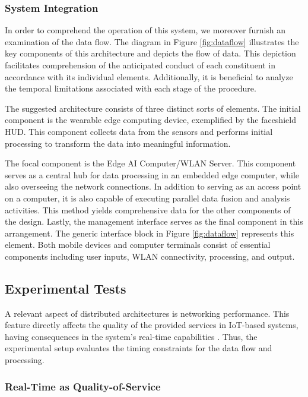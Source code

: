 \subsubsection{System Integration}

In order to comprehend the operation of this system, we moreover furnish an examination of the data flow. The diagram in Figure \ref{fig:dataflow} illustrates the key components of this architecture and depicts the flow of data. This depiction facilitates comprehension of the anticipated conduct of each constituent in accordance with its individual elements. Additionally, it is beneficial to analyze the temporal limitations associated with each stage of the procedure.

The suggested architecture consists of three distinct sorts of elements. The initial component is the wearable edge computing device, exemplified by the faceshield HUD. This component collects data from the sensors and performs initial processing to transform the data into meaningful information. 

The focal component is the Edge AI Computer/WLAN Server. This component serves as a central hub for data processing in an embedded edge computer, while also overseeing the network connections. In addition to serving as an access point on a computer, it is also capable of executing parallel data fusion and analysis activities. This method yields comprehensive data for the other components of the design. 
Lastly, the management interface serves as the final component in this arrangement. The generic interface block in Figure \ref{fig:dataflow} represents this element. Both mobile devices and computer terminals consist of essential components including user inputs, WLAN connectivity, processing, and output. 

\subsection{Experimental Tests}

A relevant aspect of distributed architectures is networking performance. This feature directly affects the quality of the provided services in IoT-based systems, having consequences in the system's real-time capabilities \cite{cao2018qos}. Thus, the experimental setup evaluates the timing constraints for the data flow and processing.

\subsubsection{Real-Time as Quality-of-Service}

